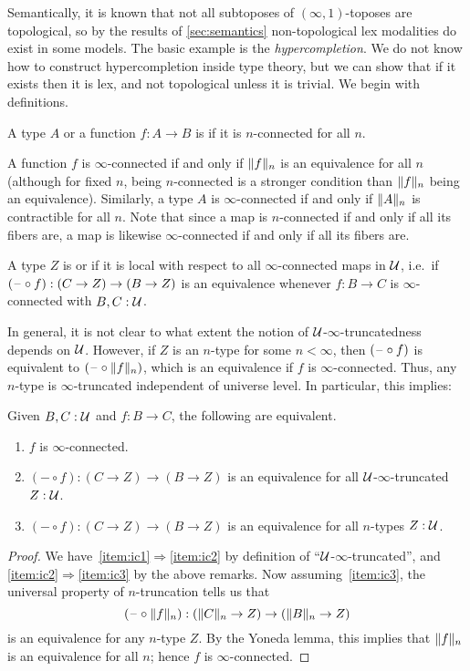 Semantically, it is known that not all subtoposes of $(\infty,1)$-toposes are topological, so by the results of \cref{sec:semantics} non-topological lex modalities do exist in some models.
The basic example is the \emph{hypercompletion}.
We do not know how to construct hypercompletion inside type theory, but we can show that if it exists then it is lex, and not topological unless it is trivial.
We begin with definitions.

\begin{defn}
  A type $A$ or a function $f:A\to B$ is  if it is $n$-connected for all $n$.
\end{defn}

A function $f$ is $\infty$-connected if and only if $\trunc n f$ is an equivalence for all $n$ (although for fixed $n$, being $n$-connected is a stronger condition than $\trunc n f$ being an equivalence).
Similarly, a type $A$ is $\infty$-connected if and only if $\trunc n A$ is contractible for all $n$.
Note that since a map is $n$-connected if and only if all its fibers are, a map is likewise $\infty$-connected if and only if all its fibers are.

\begin{defn}
  A type $Z$ is  or  if it is local with respect to all $\infty$-connected maps in $\UU$, i.e.\ if $(\blank\circ f):(C\to Z) \to (B\to Z)$ is an equivalence whenever $f:B\to C$ is $\infty$-connected with $B,C:\UU$.
\end{defn}

In general, it is not clear to what extent the notion of $\UU$-$\infty$-truncatedness depends on $\UU$.
However, if $Z$ is an $n$-type for some $n<\infty$, then $(\blank\circ f)$ is equivalent to $(\blank\circ \trunc nf)$, which is an equivalence if $f$ is $\infty$-connected.
Thus, any $n$-type is $\infty$-truncated independent of universe level.
In particular, this implies:

\begin{lem}\label{thm:infconn}
  Given $B,C:\UU$ and $f:B\to C$, the following are equivalent.
  \begin{enumerate}
  \item $f$ is $\infty$-connected.\label{item:ic1}
  \item $(-\circ f):(C\to Z) \to (B\to Z)$ is an equivalence for all $\UU$-$\infty$-truncated $Z:\UU$.\label{item:ic2}
  \item $(-\circ f):(C\to Z) \to (B\to Z)$ is an equivalence for all $n$-types $Z:\UU$.\label{item:ic3}
  \end{enumerate}
\end{lem}
\begin{proof}
  We have~\ref{item:ic1}$\Rightarrow$\ref{item:ic2} by definition of ``$\UU$-$\infty$-truncated'', and \ref{item:ic2}$\Rightarrow$\ref{item:ic3} by the above remarks.
  Now assuming~\ref{item:ic3}, the universal property of $n$-truncation tells us that
  \[ (\blank\circ \trunc nf):(\trunc n C\to Z) \to (\trunc nB\to Z) \]
  is an equivalence for any $n$-type $Z$.
  By the Yoneda lemma, this implies that $\trunc n f$ is an equivalence for all $n$; hence $f$ is $\infty$-connected.
\end{proof}

